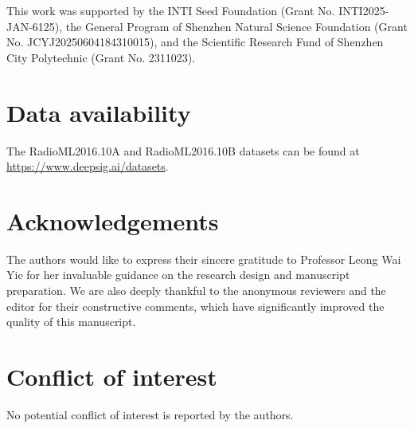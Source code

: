 \documentclass{article}
\begin{document}
	This work was supported by the INTI Seed Foundation (Grant No. INTI2025-JAN-6125), the General Program of Shenzhen Natural Science Foundation (Grant No. JCYJ20250604184310015), and the Scientific Research Fund of Shenzhen City Polytechnic (Grant No. 2311023).
	
	\section*{Data availability}
	
	The RadioML2016.10A and RadioML2016.10B datasets can be found at \url{https://www.deepsig.ai/datasets}. 
	
	\section*{Acknowledgements}
	
	The authors would like to express their sincere gratitude to Professor Leong Wai Yie for her invaluable guidance on the research design and manuscript preparation. We are also deeply thankful to the anonymous reviewers and the editor for their constructive comments, which have significantly improved the quality of this manuscript.
	
	\section*{Conflict of interest}
	
	No potential conflict of interest is reported by the authors.
	
	
	\printbibliography
	
\end{document}
